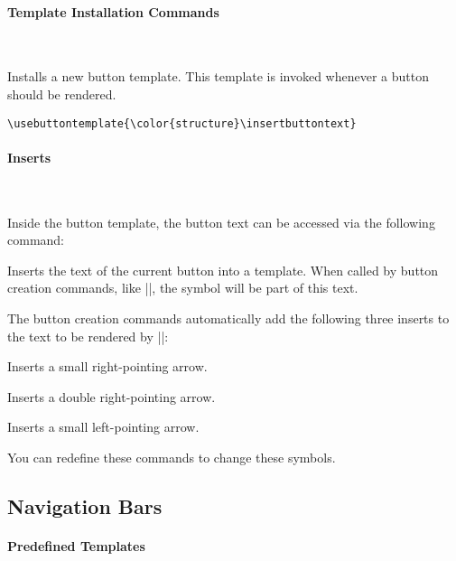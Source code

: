 \paragraph{Template Installation Commands}\ 

\begin{command}{\usebuttontemplate{}}
  Installs a new button template. This template is invoked whenever a
  button should be rendered.
  \example
\begin{verbatim}
\usebuttontemplate{\color{structure}\insertbuttontext}
\end{verbatim}
\end{command}


\paragraph{Inserts}\ 

Inside the button template, the button text can be accessed via the
following command:

\begin{command}{\insertbuttontext}
  Inserts the text of the current button into a template. When called
  by  button creation commands, like |\beamerskipbutton|, the symbol
  will be part of this text.
\end{command}

The button creation commands automatically add the following three
inserts to the text to be rendered by |\insertbuttontext|:

\begin{command}{\insertgotosymbol}
  Inserts a small right-pointing arrow.
\end{command}

\begin{command}{\insertskipsymbol}
  Inserts a double right-pointing arrow.
\end{command}

\begin{command}{\insertreturnsymbol}
  Inserts a small left-pointing arrow.
\end{command}

You can redefine these commands to change these symbols.




\subsection{Navigation Bars}

\paragraph{Predefined Templates}\ 

